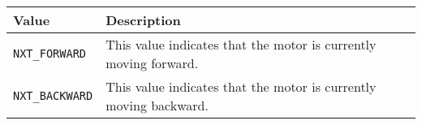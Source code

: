 \\
\noindent
\begin{tabular}{p{1.75in}p{4.5in}} \hline 
Value & Description \\
\hline 
\texttt{NXT\_FORWARD} & This value indicates that the motor is currently moving forward. \\
\texttt{NXT\_BACKWARD}& This value indicates that the motor is currently moving backward.\\
\hline
\end{tabular}\\

